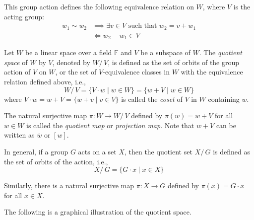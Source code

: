 \documentclass[
	11pt, %
	fleqn, %
	a4paper, %
]{LegrandOrangeBook}
\renewcommand{\bar}[1]{\overline{#1}} %
\newcommand{\quotient}[2]{#1/\, #2} %
\newcommand{\F}{\mathbb{F}} %
\begin{document}
This group action defines the following equivalence relation on $W$, where $V$ is the acting group:
\[
    \begin{split}
        w_1 \sim w_2 & \implies \exists v \in V \text{ such that } w_2 = v + w_1 \\
        & \iff w_2 - w_1 \in V
    \end{split}
\]

\begin{definition}
    Let $W$ be a linear space over a field $\F$ and $V$ be a subspace of $W$. The \emph{quotient space} of $W$ by $V$, denoted by $\quotient{W}{V}$, is defined as the set of orbits of the group action of $V$ on $W$, or the set of $V$-equivalence classes in $W$ with the equivalence relation defined above, i.e.,
    \[
        \quotient{W}{V} = \{ V \cdot w \mid w \in W \} = \{ w + V \mid w \in W \}
    \]
    where $V \cdot w = w + V = \{ w + v \mid v \in V \}$ is called the \emph{coset} of $V$ in $W$ containing $w$.
\end{definition}

\begin{definition}
    The natural surjective map $\pi : W \to \quotient{W}{V}$ defined by $\pi(w) = w + V$ for all $w \in W$ is called the \emph{quotient map} or \emph{projection map}. Note that $w + V$ can be written as $\bar{w}$ or $[w]$.
\end{definition}

In general, if a group $G$ acts on a set $X$, then the quotient set $\quotient{X}{G}$ is defined as the set of orbits of the action, i.e.,
\[
    \quotient{X}{G} = \{ G \cdot x \mid x \in X \}
\]

Similarly, there is a natural surjective map $\pi : X \to G$ defined by $\pi(x) = G \cdot x$ for all $x \in X$.

The following is a graphical illustration of the quotient space.
\end{document}
